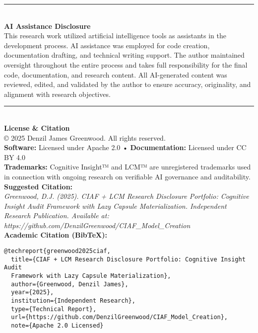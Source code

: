\documentclass[12pt,a4paper]{article}
\begin{document}
\begin{center}
\textcolor{ciafgray}{\rule{0.8\textwidth}{0.4pt}}\\
\vspace{0.3cm}
\textbf{AI Assistance Disclosure}\\
\vspace{0.2cm}
This research work utilized artificial intelligence tools as assistants in the development process. AI assistance was employed for code creation, documentation drafting, and technical writing support. The author maintained oversight throughout the entire process and takes full responsibility for the final code, documentation, and research content. All AI-generated content was reviewed, edited, and validated by the author to ensure accuracy, originality, and alignment with research objectives.\\
\vspace{0.3cm}
\textcolor{ciafgray}{\rule{0.8\textwidth}{0.4pt}}\\
\vspace{0.3cm}
\textbf{License \& Citation}\\
\vspace{0.3cm}
© 2025 Denzil James Greenwood. All rights reserved.\\
\textbf{Software:} Licensed under Apache 2.0 • \textbf{Documentation:} Licensed under CC BY 4.0\\
\textbf{Trademarks:} Cognitive Insight™ and LCM™ are unregistered trademarks used in connection with ongoing research on verifiable AI governance and auditability.\\
\vspace{0.2cm}
\textbf{Suggested Citation:}\\
\textit{Greenwood, D.J. (2025). CIAF + LCM Research Disclosure Portfolio: Cognitive Insight Audit Framework with Lazy Capsule Materialization. Independent Research Publication. Available at: https://github.com/DenzilGreenwood/CIAF\_Model\_Creation}\\
\vspace{0.25cm}
\textbf{Academic Citation (BibTeX):}\\
\begin{verbatim}
@techreport{greenwood2025ciaf,
  title={CIAF + LCM Research Disclosure Portfolio: Cognitive Insight Audit 
  Framework with Lazy Capsule Materialization},
  author={Greenwood, Denzil James},
  year={2025},
  institution={Independent Research},
  type={Technical Report},
  url={https://github.com/DenzilGreenwood/CIAF_Model_Creation},
  note={Apache 2.0 Licensed}

\end{verbatim}
\end{center}
\end{document}
